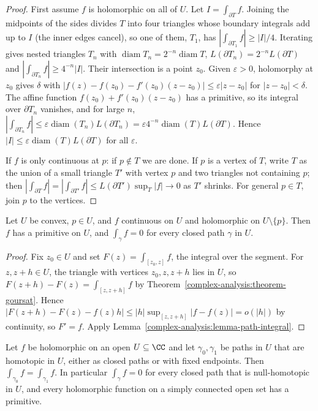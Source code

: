\begin{proof}
First assume $f$ is holomorphic on all of $U$. Let $I = \int_{\partial T}f$. Joining the midpoints of the sides divides $T$ into four triangles whose boundary integrals add up to $I$ (the inner edges cancel),
so one of them, $T_1$, has $|\int_{\partial T_1}f| \geq |I|/4$. Iterating gives nested triangles $T_n$ with $\operatorname{diam}T_n = 2^{-n}\operatorname{diam}T$, $L(\partial T_n) = 2^{-n}L(\partial T)$ and
$|\int_{\partial T_n}f| \geq 4^{-n}|I|$. Their intersection is a point $z_0$. Given $\varepsilon > 0$, holomorphy at $z_0$ gives $\delta$ with $|f(z) - f(z_0) - f'(z_0)(z - z_0)| \leq \varepsilon|z - z_0|$ for
$|z - z_0| < \delta$. The affine function $f(z_0) + f'(z_0)(z - z_0)$ has a primitive, so its integral over $\partial T_n$ vanishes, and for large $n$,
$|\int_{\partial T_n}f| \leq \varepsilon\operatorname{diam}(T_n)L(\partial T_n) = \varepsilon4^{-n}\operatorname{diam}(T)L(\partial T)$. Hence $|I| \leq \varepsilon\operatorname{diam}(T)L(\partial T)$ for all
$\varepsilon$.

If $f$ is only continuous at $p$: if $p \notin T$ we are done. If $p$ is a vertex of $T$, write $T$ as the union of a small triangle $T'$ with vertex $p$ and two triangles not containing $p$; then
$|\int_{\partial T}f| = |\int_{\partial T'}f| \leq L(\partial T')\sup_T|f| \to 0$ as $T'$ shrinks. For general $p \in T$, join $p$ to the vertices.
\end{proof}

\begin{corollary}\label{complex-analysis:corollary-primitive-convex}
Let $U$ be convex, $p \in U$, and $f$ continuous on $U$ and holomorphic on $U \setminus \{p\}$. Then $f$ has a primitive on $U$, and $\int_\gamma f = 0$ for every closed path $\gamma$ in $U$.
\end{corollary}

\begin{proof}
Fix $z_0 \in U$ and set $F(z) = \int_{[z_0, z]}f$, the integral over the segment. For $z, z + h \in U$, the triangle with vertices $z_0, z, z + h$ lies in $U$, so $F(z + h) - F(z) = \int_{[z, z+h]}f$ by
Theorem~\ref{complex-analysis:theorem-goursat}. Hence $|F(z + h) - F(z) - f(z)h| \leq |h|\sup_{[z, z+h]}|f - f(z)| = o(|h|)$ by continuity, so $F' = f$. Apply Lemma~\ref{complex-analysis:lemma-path-integral}.
\end{proof}

\begin{theorem}\label{complex-analysis:theorem-cauchy-homotopy}
Let $f$ be holomorphic on an open $U \subseteq \CC$ and let $\gamma_0, \gamma_1$ be paths in $U$ that are homotopic in $U$, either as closed paths or with fixed endpoints. Then
$\int_{\gamma_0}f = \int_{\gamma_1}f$. In particular $\int_\gamma f = 0$ for every closed path that is null-homotopic in $U$, and every holomorphic function on a simply connected open set has a primitive.
\end{theorem}

